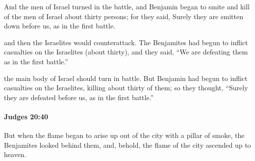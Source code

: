 			\begin{versebox}
					\item[BHS] 
					\item[ASV] And the men of Israel turned in the battle, and Benjamin began to smite and kill of the men of Israel about thirty persons; for they said, Surely they are smitten down before us, as in the first battle.
					\item[NIV] and then the Israelites would counterattack. The Benjamites had begun to inflict casualties on the Israelites (about thirty), and they said, “We are defeating them as in the first battle.”
					\item[NRSV] the main body of Israel should turn in battle. But Benjamin had begun to inflict casualties on the Israelites, killing about thirty of them; so they thought, “Surely they are defeated before us, as in the first battle.”
			\end{versebox}

		\paragraph{Judges 20:40} %
			\label{JUDGES-20-40}

			But when the flame began to arise up out of the city with a pillar of smoke, the Benjamites looked behind them, and, behold, the flame of the city ascended up to heaven.

